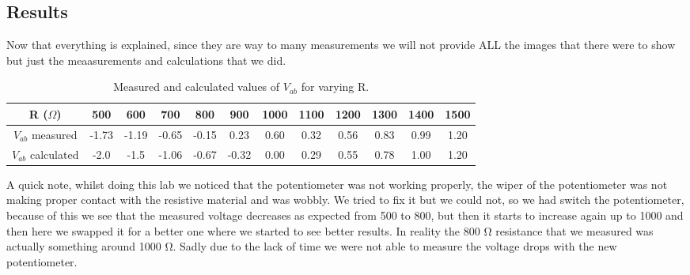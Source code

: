 \documentclass[a4paper, 10pt]{article}
\begin{document}
		\subsection{Results}
			Now that everything is explained, since they are way to many measurements we will not provide ALL the images
			that there were to show but just the meaasurements and calculations that we did.

			\begin{table}[ht]
				\centering
				\begin{tabular}{|c|c|c|c|c|c|c|c|c|c|c|c|}
					\hline
					R ($\Omega$) & 500 & 600 & 700 & 800 & 900 & 1000 & 1100 & 1200 & 1300 & 1400 & 1500 \\ \hline
					$V_{ab}$ measured & -1.73 & -1.19 & -0.65 & -0.15 & 0.23 & 0.60 & 0.32 & 0.56 & 0.83 & 0.99 & 1.20 \\ \hline
					$V_{ab}$ calculated & -2.0 & -1.5 & -1.06 & -0.67 & -0.32 & 0.00 & 0.29 & 0.55 & 0.78 & 1.00 & 1.20 \\ \hline
				\end{tabular}
				\caption{Measured and calculated values of $V_{ab}$ for varying R.}
				\label{tab:my_label}
			\end{table}

			A quick note, whilst doing this lab we noticed that the potentiometer was not working properly, 
			the wiper of the potentiometer was not making proper contact with the resistive material and was wobbly.
			We tried to fix it but we could not, so we had switch the potentiometer, because of this we see that
			the measured voltage decreases as expected from 500 to 800, but then it starts to increase again
			up to 1000 and then here we swapped it for a better one where we started to see better results.
			In reality the 800 \si{\ohm} resistance that we measured was actually something around 1000 \si{\ohm}.
			Sadly due to the lack of time we were not able to measure the voltage drops with the new potentiometer.
\end{document}
